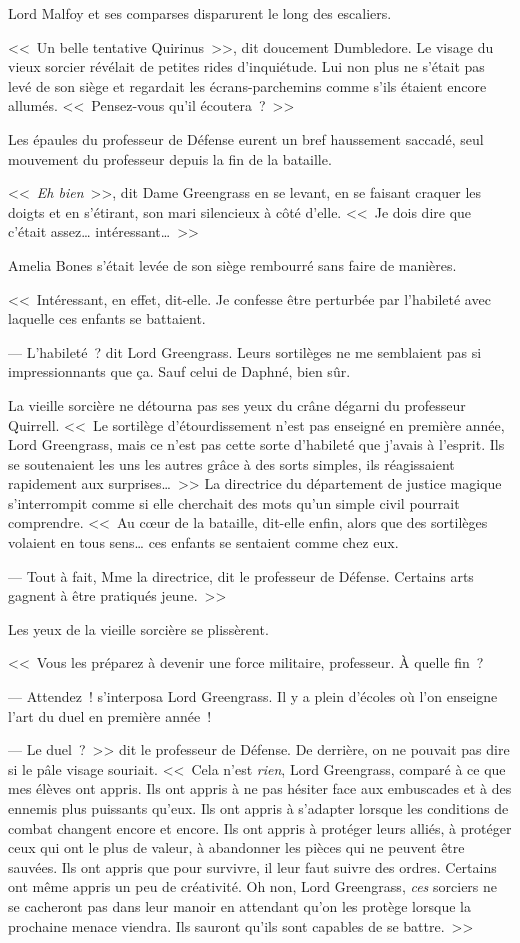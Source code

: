 Lord Malfoy et ses comparses disparurent le long des escaliers.

<<~Un belle tentative Quirinus~>>, dit doucement Dumbledore. Le visage du vieux sorcier révélait de petites rides d'inquiétude. Lui non plus ne s'était pas levé de son siège et regardait les écrans-parchemins comme s'ils étaient encore allumés. <<~Pensez-vous qu'il écoutera~?~>>

Les épaules du professeur de Défense eurent un bref haussement saccadé, seul mouvement du professeur depuis la fin de la bataille.

<<~\emph{Eh bien}~>>, dit Dame Greengrass en se levant, en se faisant craquer les doigts et en s'étirant, son mari silencieux à côté d'elle. <<~Je dois dire que c'était assez… intéressant…~>>

Amelia Bones s'était levée de son siège rembourré sans faire de manières.

<<~Intéressant, en effet, dit-elle. Je confesse être perturbée par l'habileté avec laquelle ces enfants se battaient.

--- L'habileté~? dit Lord Greengrass. Leurs sortilèges ne me semblaient pas si impressionnants que ça. Sauf celui de Daphné, bien sûr.

La vieille sorcière ne détourna pas ses yeux du crâne dégarni du professeur Quirrell. <<~Le sortilège d'étourdissement n'est pas enseigné en première année, Lord Greengrass, mais ce n'est pas cette sorte d'habileté que j'avais à l'esprit. Ils se soutenaient les uns les autres grâce à des sorts simples, ils réagissaient rapidement aux surprises…~>> La directrice du département de justice magique s'interrompit comme si elle cherchait des mots qu'un simple civil pourrait comprendre. <<~Au cœur de la bataille, dit-elle enfin, alors que des sortilèges volaient en tous sens… ces enfants se sentaient comme chez eux.

--- Tout à fait, Mme la directrice, dit le professeur de Défense. Certains arts gagnent à être pratiqués jeune.~>>

Les yeux de la vieille sorcière se plissèrent.

<<~Vous les préparez à devenir une force militaire, professeur. À quelle fin~?

--- Attendez~! s'interposa Lord Greengrass. Il y a plein d'écoles où l'on enseigne l'art du duel en première année~!

--- Le duel~?~>> dit le professeur de Défense. De derrière, on ne pouvait pas dire si le pâle visage souriait. <<~Cela n'est \emph{rien}, Lord Greengrass, comparé à ce que mes élèves ont appris. Ils ont appris à ne pas hésiter face aux embuscades et à des ennemis plus puissants qu'eux. Ils ont appris à s'adapter lorsque les conditions de combat changent encore et encore. Ils ont appris à protéger leurs alliés, à protéger ceux qui ont le plus de valeur, à abandonner les pièces qui ne peuvent être sauvées. Ils ont appris que pour survivre, il leur faut suivre des ordres. Certains ont même appris un peu de créativité. Oh non, Lord Greengrass, \emph{ces} sorciers ne se cacheront pas dans leur manoir en attendant qu'on les protège lorsque la prochaine menace viendra. Ils sauront qu'ils sont capables de se battre.~>>

